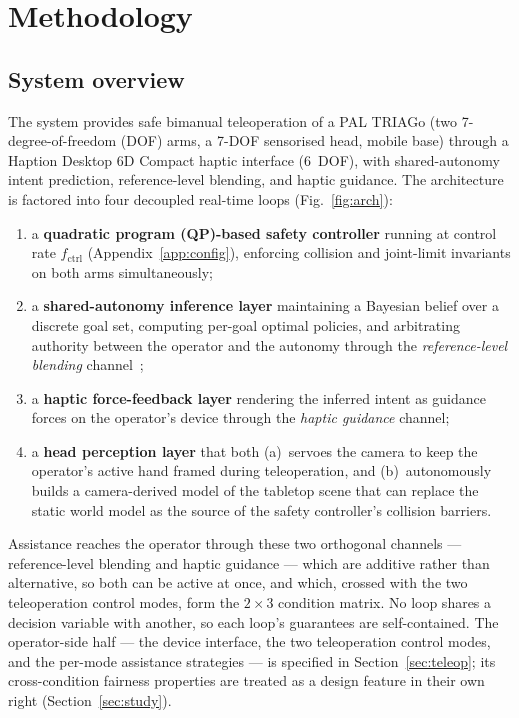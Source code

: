 \documentclass[12pt,a4paper,twoside,openright]{report}
\begin{document}
\chapter{Methodology}
\label{ch:method}

\section{System overview}
\label{sec:overview}

The system provides safe bimanual teleoperation of a PAL TRIAGo (two 7-degree-of-freedom (DOF) arms, a 7-DOF sensorised head, mobile base) through a Haption Desktop 6D Compact haptic interface (6~DOF), with shared-autonomy intent prediction, reference-level blending, and haptic guidance.
The architecture is factored into four decoupled real-time loops (Fig.~\ref{fig:arch}):
\begin{enumerate}[nosep]
\item a \textbf{quadratic program (QP)-based safety controller} running at control rate $f_{\text{ctrl}}$ (Appendix~\ref{app:config}), enforcing collision and joint-limit invariants on both arms simultaneously;
\item a \textbf{shared-autonomy inference layer} maintaining a Bayesian belief over a discrete goal set, computing per-goal optimal policies, and arbitrating authority between the operator and the autonomy through the \emph{reference-level blending} channel~\cite{dragan2013policy,javdani2018hindsight,losey2018review};
\item a \textbf{haptic force-feedback layer} rendering the inferred intent as guidance forces on the operator's device through the \emph{haptic guidance} channel;
\item a \textbf{head perception layer} that both (a)~servoes the camera to keep the operator's active hand framed during teleoperation, and (b)~autonomously builds a camera-derived model of the tabletop scene that can replace the static world model as the source of the safety controller's collision barriers.
\end{enumerate}
Assistance reaches the operator through these two orthogonal channels --- reference-level blending and haptic guidance --- which are additive rather than alternative, so both can be active at once, and which, crossed with the two teleoperation control modes, form the $2\times3$ condition matrix. No loop shares a decision variable with another, so each loop's guarantees are self-contained. The operator-side half --- the device interface, the two teleoperation control modes, and the per-mode assistance strategies --- is specified in Section~\ref{sec:teleop}; its cross-condition fairness properties are treated as a design feature in their own right (Section~\ref{sec:study}).
\end{document}
